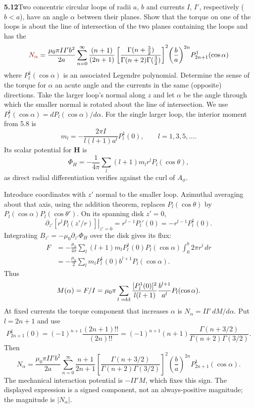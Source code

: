 \par\bigskip
\noindent\textbf{5.12}\quad Two concentric circular loops of radii $a$, $b$ and currents $I$, $I'$, respectively ($b<a$), have an angle $\alpha$ between their planes. Show that the torque on one of the loops is about the line of intersection of the two planes containing the loops and has the 
\[
\erratum{N_\alpha}=\frac{\mu_{0}\pi II'b^{2}}{2a}\sum_{n=0}^{\infty}\frac{(n+1)}{(2n+1)}\left[\frac{\Gamma(n+\frac{3}{2})}{\Gamma(n+2)\Gamma(\frac{3}{2})}\right]^{2}\!\left(\frac{b}{a}\right)^{2n}\!P_{2n+1}^{1}(\cos\alpha)
\]
where $P_{l}^{1}(\cos\alpha)$ is an associated Legendre polynomial. Determine the sense of the torque for $\alpha$ an acute angle and the currents in the same (opposite) directions.
\solution
Take the larger loop's normal along $z$ and let $\alpha$ be the angle
through which the smaller normal is rotated about the line of intersection.
We use $P_l^1(\cos\alpha)=dP_l(\cos\alpha)/d\alpha$.
For the single larger loop, the interior moment from 5.8 is
\[
m_l=-\frac{2\pi I}{l(l+1)a^l}P_l^1(0),\qquad l=1,3,5,\ldots.
\]
Its scalar potential for $\mathbf H$ is
\[
\Phi_H=-\frac1{4\pi}\sum_l(l+1)m_lr^lP_l(\cos\theta),
\]
as direct radial differentiation verifies against the curl of $A_\phi$.

Introduce coordinates with $z'$ normal to the smaller loop.
Azimuthal averaging about that axis, using the addition theorem, replaces
$P_l(\cos\theta)$ by $P_l(\cos\alpha)P_l(\cos\theta')$.
On its spanning disk $z'=0$,
\[
\left.\partial_{z'}[r^lP_l(z'/r)]\right|_{z'=0}
=r^{l-1}P_l'(0)=-r^{l-1}P_l^1(0).
\]
Integrating $B_{z'}=-\mu_0\partial_{z'}\Phi_H$ over the disk gives its flux:
\[
\begin{split}
F&=-\frac{\mu_0}{4\pi}\sum_l(l+1)m_lP_l^1(0)P_l(\cos\alpha)
\int_0^b2\pi r^l\,dr\\
&=-\frac{\mu_0}{2}\sum_lm_lP_l^1(0)b^{l+1}P_l(\cos\alpha).
\end{split}
\]
Thus
\[
M(\alpha)=F/I=\mu_0\pi\sum_{l\ {\rm odd}}
\frac{[P_l^1(0)]^2}{l(l+1)}
\frac{b^{l+1}}{a^l}P_l(\cos\alpha).
\]
At fixed currents the torque component that increases $\alpha$ is
$N_\alpha=II'\,dM/d\alpha$. Put $l=2n+1$ and use
\[
P_{2n+1}^1(0)=(-1)^{n+1}\frac{(2n+1)!!}{(2n)!!}
=(-1)^{n+1}(n+1)
\frac{\Gamma(n+3/2)}{\Gamma(n+2)\Gamma(3/2)}.
\]
Then
\[
\boxed{N_\alpha=\frac{\mu_0\pi II'b^2}{2a}
\sum_{n=0}^\infty\frac{n+1}{2n+1}
\left[\frac{\Gamma(n+3/2)}{\Gamma(n+2)\Gamma(3/2)}\right]^2
\left(\frac ba\right)^{2n}P_{2n+1}^1(\cos\alpha).}
\]
The mechanical interaction potential is $-II'M$, which fixes this sign.
The displayed expression is a signed component, not an always-positive
magnitude; the magnitude is $|N_\alpha|$.


